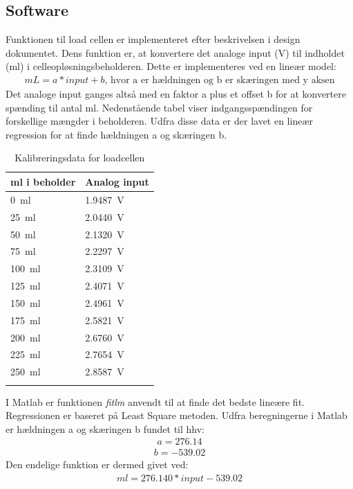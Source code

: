 \subsection{Software}
Funktionen til load cellen er implementeret efter beskrivelsen i design dokumentet. Dens funktion er, at konvertere det analoge input (V) til indholdet (ml) i celleopløsningsbeholderen. Dette er implementeres ved en lineær model:
\begin{align}
mL = a*input+b \text{, hvor a er hældningen og b er skæringen med y aksen}
\end{align}
Det analoge input ganges altså med en faktor a plus et offset b for at konvertere spænding til antal ml. Nedenstående tabel viser indgangsspændingen for forskellige mængder i beholderen. Udfra disse data er der lavet en lineær regression for at finde hældningen a og skæringen b.
\begin{center}
		\begin{longtable}{ | m{3cm} | m{3cm}| } 
			\hline
			\textbf{ml i beholder} &\textbf{Analog input} \\ 
			\hline
			 \SI{0}{\milli\litre} & \SI{1.9487}{\volt} \\ 
			\hline
			 \SI{25}{\milli\litre} & \SI{2.0440}{\volt} \\ 
			\hline
			\SI{50}{\milli\litre} & \SI{2.1320}{\volt} \\ 
			\hline
			\SI{75}{\milli\litre} & \SI{2.2297}{\volt} \\ 
			\hline
			\SI{100}{\milli\litre} & \SI{2.3109}{\volt} \\ 
			\hline
			\SI{125}{\milli\litre} & \SI{2.4071}{\volt} \\ 
			\hline
			\SI{150}{\milli\litre} & \SI{2.4961}{\volt} \\ 
			\hline
			\SI{175}{\milli\litre} & \SI{2.5821}{\volt} \\ 
			\hline
			\SI{200}{\milli\litre} & \SI{2.6760}{\volt} \\ 
			\hline
			\SI{225}{\milli\litre} & \SI{2.7654}{\volt} \\ 
			\hline
			\SI{250}{\milli\litre} & \SI{2.8587}{\volt} \\ 
			\hline
			\caption{Kalibreringsdata for loadcellen}
			 		\end{longtable}
\end{center}

I Matlab er funktionen \textit{fitlm} anvendt til at finde det bedste lineære fit. Regressionen er baseret på Least Square metoden. 
Udfra beregningerne i Matlab er hældningen a og skæringen b fundet til hhv:
\begin{align}
a = 276.14
\end{align}
\begin{align}
b = -539.02
\end{align}
Den endelige funktion er dermed givet ved:
\begin{align}
ml = 276.140*input-539.02
\end{align}

